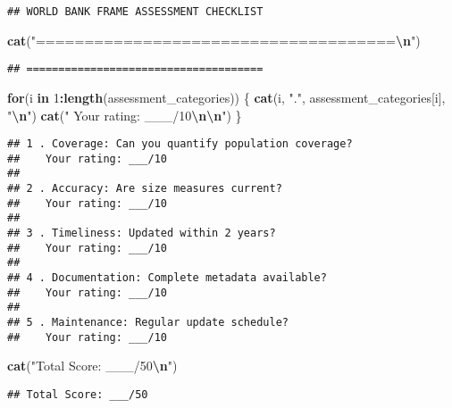 \documentclass[
]{article}
\newenvironment{Shaded}{\begin{snugshade}}{\end{snugshade}}
\newcommand{\ControlFlowTok}[1]{\textcolor[rgb]{0.13,0.29,0.53}{\textbf{#1}}}
\newcommand{\DecValTok}[1]{\textcolor[rgb]{0.00,0.00,0.81}{#1}}
\newcommand{\FunctionTok}[1]{\textcolor[rgb]{0.13,0.29,0.53}{\textbf{#1}}}
\newcommand{\NormalTok}[1]{#1}
\newcommand{\SpecialCharTok}[1]{\textcolor[rgb]{0.81,0.36,0.00}{\textbf{#1}}}
\newcommand{\StringTok}[1]{\textcolor[rgb]{0.31,0.60,0.02}{#1}}
\begin{document}
\begin{verbatim}
## WORLD BANK FRAME ASSESSMENT CHECKLIST
\end{verbatim}

\begin{Shaded}
\begin{Highlighting}[]
\FunctionTok{cat}\NormalTok{(}\StringTok{"=====================================}\SpecialCharTok{\textbackslash{}n}\StringTok{"}\NormalTok{)}
\end{Highlighting}
\end{Shaded}

\begin{verbatim}
## =====================================
\end{verbatim}

\begin{Shaded}
\begin{Highlighting}[]
\ControlFlowTok{for}\NormalTok{(i }\ControlFlowTok{in} \DecValTok{1}\SpecialCharTok{:}\FunctionTok{length}\NormalTok{(assessment\_categories)) \{}
  \FunctionTok{cat}\NormalTok{(i, }\StringTok{"."}\NormalTok{, assessment\_categories[i], }\StringTok{"}\SpecialCharTok{\textbackslash{}n}\StringTok{"}\NormalTok{)}
  \FunctionTok{cat}\NormalTok{(}\StringTok{"   Your rating: \_\_\_/10}\SpecialCharTok{\textbackslash{}n\textbackslash{}n}\StringTok{"}\NormalTok{)}
\NormalTok{\}}
\end{Highlighting}
\end{Shaded}

\begin{verbatim}
## 1 . Coverage: Can you quantify population coverage? 
##    Your rating: ___/10
## 
## 2 . Accuracy: Are size measures current? 
##    Your rating: ___/10
## 
## 3 . Timeliness: Updated within 2 years? 
##    Your rating: ___/10
## 
## 4 . Documentation: Complete metadata available? 
##    Your rating: ___/10
## 
## 5 . Maintenance: Regular update schedule? 
##    Your rating: ___/10
\end{verbatim}

\begin{Shaded}
\begin{Highlighting}[]
\FunctionTok{cat}\NormalTok{(}\StringTok{"Total Score: \_\_\_/50}\SpecialCharTok{\textbackslash{}n}\StringTok{"}\NormalTok{)}
\end{Highlighting}
\end{Shaded}

\begin{verbatim}
## Total Score: ___/50
\end{verbatim}
\end{document}
